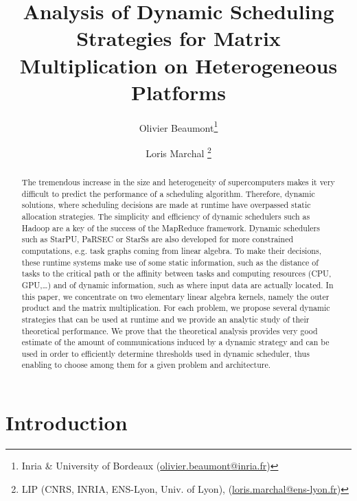 \documentclass[a4paper,10pt]{article}
\begin{document}
\title{Analysis of Dynamic Scheduling Strategies for Matrix Multiplication on Heterogeneous Platforms}


\author{Olivier Beaumont\footnote{Inria \& University of Bordeaux (\protect\url{olivier.beaumont@inria.fr})} 
  \and 
  Loris Marchal \footnote{LIP (CNRS, INRIA, ENS-Lyon, Univ. of Lyon), (\protect\url{loris.marchal@ens-lyon.fr})}}

\maketitle


\begin{abstract} 
  The tremendous increase in the size and heterogeneity of
  supercomputers makes it very difficult to predict the performance of
  a scheduling algorithm. Therefore, dynamic solutions, where
  scheduling decisions are made at runtime have overpassed static
  allocation strategies. The simplicity and efficiency of dynamic
  schedulers such as Hadoop are a key of the success of the MapReduce
  framework. Dynamic schedulers such as StarPU, PaRSEC or
  StarSs are also developed for more constrained computations, e.g. 
  task graphs coming from linear algebra. To make their decisions,
  these runtime systems make use of some static information, such as
  the distance of tasks to the critical path or the affinity between
  tasks and computing resources (CPU, GPU,\ldots) and of dynamic
  information, such as where input data are actually located. In this
  paper, we concentrate on two elementary linear algebra kernels, namely the
  outer product and the matrix multiplication. For each problem, we
  propose several dynamic strategies that can be used at runtime and
  we provide an analytic study of their theoretical performance. We
  prove that the theoretical analysis provides very good estimate of
  the amount of communications induced by a dynamic strategy and can
be used in order to efficiently determine thresholds used in dynamic scheduler, thus
  enabling to choose among them for a given problem and architecture.
\end{abstract}


\section{Introduction}
\label{intro}
\end{document}
